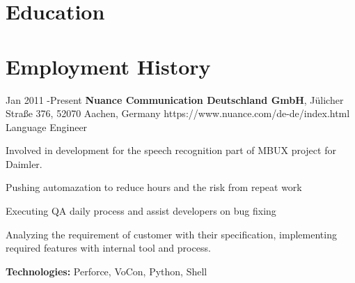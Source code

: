 \documentclass[10pt]{article} %
\begin{document}

\section{Education}





\section{Employment History}

\job
{Jan 2011 -}{Present}
{{\bf Nuance Communication Deutschland GmbH}, J\"ulicher Stra\ss e 376, 52070 Aachen, Germany}
{https://www.nuance.com/de-de/index.html}
{Language Engineer}
{Involved in development for the speech recognition part of MBUX project for Daimler.
\begin{itemize-noindent}
	\item{Pushing automazation to reduce hours and the risk from repeat work}
	\item{Executing QA daily process and assist developers on bug fixing}
	\item{Analyzing the requirement of customer with their specification, implementing required features with internal tool and process.}
\end{itemize-noindent}
\rule{0mm}{5mm}\textbf{Technologies:} Perforce, VoCon, Python, Shell}
\end{document}
